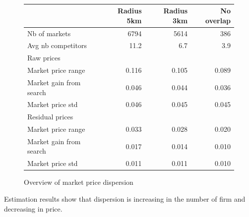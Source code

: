\documentclass[11pt]{article}
\begin{document}
\ \\
\begin{figure}
\caption{Overview of market price dispersion}
\begin{center}
\begin{tabular}{lrrr}
\hline
{} & Radius 5km & Radius 3km & No overlap\\
\hline
Nb of markets & 6794 & 5614 & 386 \\
Avg nb competitors & 11.2 & 6.7 & 3.9 \\
\hline
Raw prices & & & \\
\hline
Market price range & 0.116 & 0.105 & 0.089\\
Market gain from search & 0.046 & 0.044 & 0.036 \\
Market price std & 0.046 & 0.045 & 0.045 \\
\hline
Residual prices & & & \\
\hline
Market price range & 0.033  & 0.028 & 0.020 \\
Market gain from search & 0.017 & 0.014 & 0.010 \\
Market price std & 0.011 & 0.011 & 0.010 \\
\hline
\end{tabular}
\end{center}
\end{figure}

Estimation results show that dispersion is increasing in the number of firm and decreasing in price.
\end{document}
